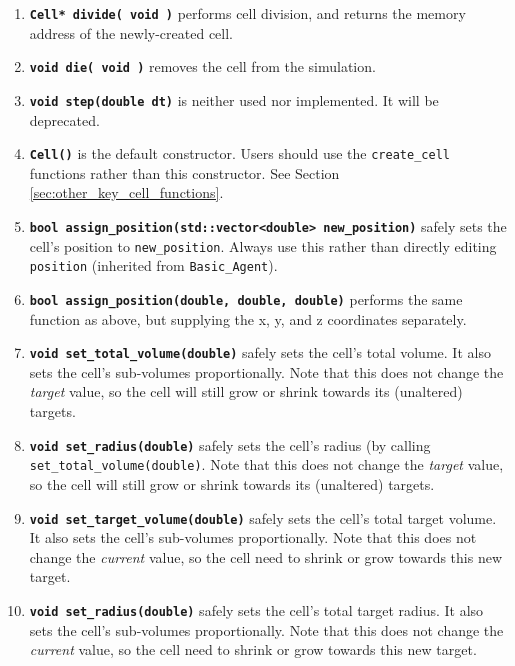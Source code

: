 \documentclass[12pt]{article}
\renewcommand{\v}{\verb}
\newcommand{\smallcode}[1]{\textbf{\texttt{#1}}}
\begin{document}
\begin{enumerate}
\item 
\smallcode{Cell* divide( void )} performs cell division, and returns 
the memory address of the newly-created cell. 

\item 
\smallcode{void die( void )} removes the cell from the simulation. 

\item 
\smallcode{void step(double dt)} is neither used nor implemented. It will 
be deprecated. 

\item 
\smallcode{Cell()} is the default constructor. Users should 
use the \v|create_cell| functions rather than this constructor. 
See Section \ref{sec:other_key_cell_functions}. 

\item 
\smallcode{bool assign\_position(std::vector<double> new\_position)} 
safely sets the cell's position to 
\v|new_position|. Always use this rather than directly editing 
\v|position| (inherited from \v|Basic_Agent|).

\item 
\smallcode{bool assign\_position(double, double, double)} performs 
the same function as above, but supplying the x, y, and z coordinates 
separately. 

\item 
\smallcode{void set\_total\_volume(double)} safely sets the cell's total volume. 
It also sets the cell's sub-volumes proportionally. Note that this does not change the 
\emph{target} value, so the cell will still grow or shrink towards its (unaltered) targets. 

\item 
\smallcode{void set\_radius(double)} safely sets the cell's radius (by calling 
\v|set_total_volume(double)|. Note that this does not change the 
\emph{target} value, so the cell will still grow or shrink towards its (unaltered) targets. 

\item 
\smallcode{void set\_target\_volume(double)} safely sets the cell's total target volume. 
It also sets the cell's sub-volumes proportionally. Note that this does not change the 
\emph{current} value, so the cell need to shrink or grow towards this new target. 

\item 
\smallcode{void set\_radius(double)} safely sets the cell's total target radius. 
It also sets the cell's sub-volumes proportionally. Note that this does not change the 
\emph{current} value, so the cell need to shrink or grow towards this new target. 


\end{enumerate}
\end{document}
